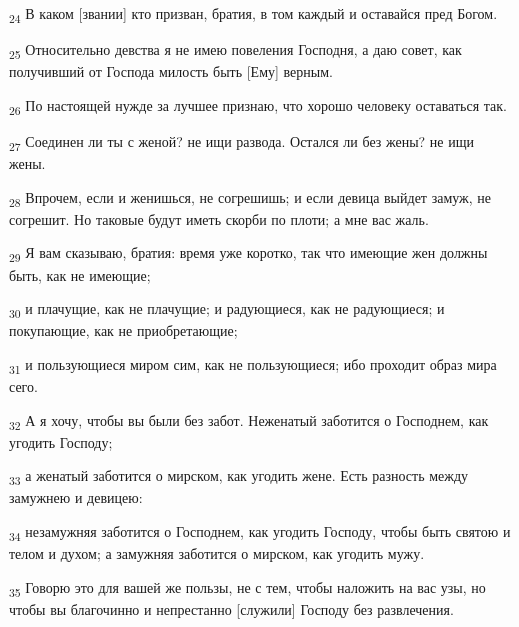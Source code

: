 \begin{tcolorbox}
\textsubscript{24} В каком [звании] кто призван, братия, в том каждый и оставайся пред Богом.
\end{tcolorbox}
\begin{tcolorbox}
\textsubscript{25} Относительно девства я не имею повеления Господня, а даю совет, как получивший от Господа милость быть [Ему] верным.
\end{tcolorbox}
\begin{tcolorbox}
\textsubscript{26} По настоящей нужде за лучшее признаю, что хорошо человеку оставаться так.
\end{tcolorbox}
\begin{tcolorbox}
\textsubscript{27} Соединен ли ты с женой? не ищи развода. Остался ли без жены? не ищи жены.
\end{tcolorbox}
\begin{tcolorbox}
\textsubscript{28} Впрочем, если и женишься, не согрешишь; и если девица выйдет замуж, не согрешит. Но таковые будут иметь скорби по плоти; а мне вас жаль.
\end{tcolorbox}
\begin{tcolorbox}
\textsubscript{29} Я вам сказываю, братия: время уже коротко, так что имеющие жен должны быть, как не имеющие;
\end{tcolorbox}
\begin{tcolorbox}
\textsubscript{30} и плачущие, как не плачущие; и радующиеся, как не радующиеся; и покупающие, как не приобретающие;
\end{tcolorbox}
\begin{tcolorbox}
\textsubscript{31} и пользующиеся миром сим, как не пользующиеся; ибо проходит образ мира сего.
\end{tcolorbox}
\begin{tcolorbox}
\textsubscript{32} А я хочу, чтобы вы были без забот. Неженатый заботится о Господнем, как угодить Господу;
\end{tcolorbox}
\begin{tcolorbox}
\textsubscript{33} а женатый заботится о мирском, как угодить жене. Есть разность между замужнею и девицею:
\end{tcolorbox}
\begin{tcolorbox}
\textsubscript{34} незамужняя заботится о Господнем, как угодить Господу, чтобы быть святою и телом и духом; а замужняя заботится о мирском, как угодить мужу.
\end{tcolorbox}
\begin{tcolorbox}
\textsubscript{35} Говорю это для вашей же пользы, не с тем, чтобы наложить на вас узы, но чтобы вы благочинно и непрестанно [служили] Господу без развлечения.
\end{tcolorbox}
